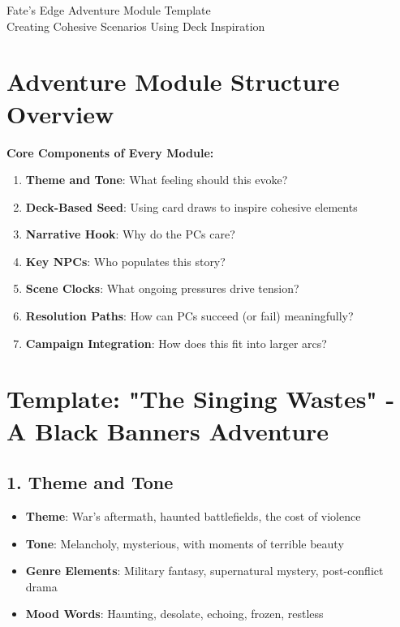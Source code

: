 \documentclass[11pt]{article}
\begin{document}
\begin{center}
{\LARGE Fate's Edge Adventure Module Template}\\
\vspace{0.5em}
{\large Creating Cohesive Scenarios Using Deck Inspiration}
\end{center}

\section*{Adventure Module Structure Overview}

\begin{mdframed}[backgroundcolor=modulebg]
\textbf{Core Components of Every Module:}
\begin{enumerate}[leftmargin=*]
\item \textbf{Theme and Tone}: What feeling should this evoke?
\item \textbf{Deck-Based Seed}: Using card draws to inspire cohesive elements
\item \textbf{Narrative Hook}: Why do the PCs care?
\item \textbf{Key NPCs}: Who populates this story?
\item \textbf{Scene Clocks}: What ongoing pressures drive tension?
\item \textbf{Resolution Paths}: How can PCs succeed (or fail) meaningfully?
\item \textbf{Campaign Integration}: How does this fit into larger arcs?
\end{enumerate}
\end{mdframed}

\section*{Template: "The Singing Wastes" - A Black Banners Adventure}

\subsection*{1. Theme and Tone}

\begin{itemize}[leftmargin=*]
\item \textbf{Theme}: War's aftermath, haunted battlefields, the cost of violence
\item \textbf{Tone}: Melancholy, mysterious, with moments of terrible beauty
\item \textbf{Genre Elements}: Military fantasy, supernatural mystery, post-conflict drama
\item \textbf{Mood Words}: Haunting, desolate, echoing, frozen, restless
\end{itemize}
\end{document}
